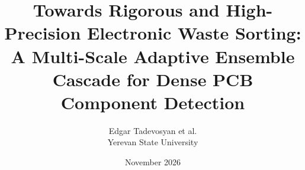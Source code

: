\documentclass[10pt,a4paper,twocolumn]{article}
\begin{document}
\title{Towards Rigorous and High-Precision Electronic Waste Sorting: A Multi-Scale Adaptive Ensemble Cascade for Dense PCB Component Detection}
\author{Edgar Tadevosyan \quad et al.\\
Yerevan State University}
\date{November 2026}
\maketitle




\end{document}
